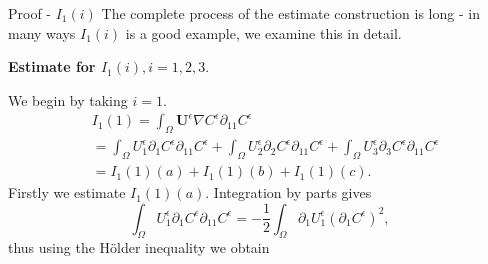 \documentclass{beamer}
\begin{document}
\begin{frame}{Proof - $I_1(i)$}
\vspace{-0.2cm}
The complete process of the estimate construction is long - in many ways $I_1(i)$ is a good example, we examine this in detail.

\textbf{Estimate for $I_1(i), i = 1,2,3.$}

We begin by taking $i=1.$
%
\begin{equation}\nonumber
  \begin{split}
    & I_1(1) = \int_\Omega \mathbf{U}^\epsilon \nabla C^\epsilon \partial_{11} C^\epsilon \\
    & = \int_\Omega U_1^\epsilon \partial_1 C^\epsilon \partial_{11} C^\epsilon + \int_\Omega U_2^\epsilon \partial_2 C^\epsilon \partial_{11} C^\epsilon + \int_\Omega U_3^\epsilon \partial_3 C^\epsilon \partial_{11} C^\epsilon \\
    & = I_1(1)(a) + I_1(1)(b) + I_1(1)(c).
  \end{split}
\end{equation}
%
Firstly we estimate $I_1(1)(a).$ Integration by parts gives
%
$$\int_\Omega U_1^\epsilon \partial_1 C^\epsilon \partial_{11} C^\epsilon = - \frac{1}{2} \int_\Omega \partial_1 U_1^\epsilon (\partial_1 C^\epsilon)^2,$$
%
\hspace{0.4cm} thus using the H\"older inequality we obtain

\end{frame}
\end{document}
